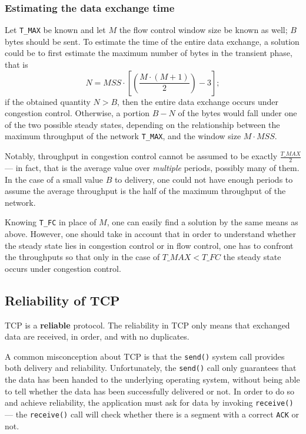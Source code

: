 \documentclass[10pt]{extreport}
\begin{document}
\subsubsection{Estimating the data exchange time}

Let \texttt{T\_MAX} be known and let $M$ the flow control window size be known
as well; $B$ bytes should be sent. To estimate the time of the entire data
exchange, a solution could be to first estimate the maximum number of bytes in
the transient phase, that is $$N = MSS \cdot [(\frac{M \cdot (M + 1)}{2}) -
3];$$ if the obtained quantity $N > B$, then the entire data exchange occurs
under congestion control. Otherwise, a portion $B - N$ of the bytes would fall
under one of the two possible steady states, depending on the relationship
between the maximum throughput of the network \texttt{T\_MAX}, and the window
size $M \cdot MSS$.

Notably, throughput in congestion control cannot be assumed to be exactly
$\frac{T\_MAX}{2}$ --- in fact, that is the average value over \emph{multiple}
periods, possibly many of them. In the case of a small value $B$ to delivery,
one could not have enough periods to assume the average throughput is the half
of the maximum throughput of the network.

Knowing \texttt{T\_FC} in place of $M$, one can easily find a solution by the
same means as above. However, one should take in account that in order to
understand whether the steady state lies in congestion control or in flow
control, one has to confront the throughputs so that only in the case of
$T\_MAX < T\_FC$ the steady state occurs under congestion control.

\subsection{Reliability of TCP}

TCP is a \textbf{reliable} protocol. The reliability in TCP only means that
exchanged data are received, in order, and with no duplicates.

A common misconception about TCP is that the \texttt{send()} system call
provides both delivery and reliability. Unfortunately, the \texttt{send()} call
only guarantees that the data has been handed to the underlying operating
system, without being able to tell whether the data has been successfully
delivered or not. In order to do so and achieve reliability, the application
must ask for data by invoking \texttt{receive()} --- the \texttt{receive()} call
will check whether there is a segment with a correct \texttt{ACK} or not.
\end{document}
